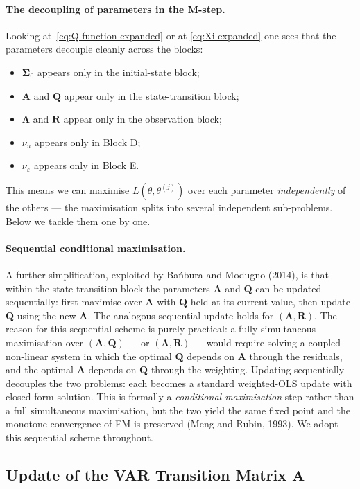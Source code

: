 \documentclass[11pt, a4paper, oneside]{article}
\newcommand{\mL}{\boldsymbol{\Lambda}}
\newcommand{\mA}{\mathbf{A}}
\newcommand{\mR}{\mathbf{R}}
\newcommand{\mQ}{\mathbf{Q}}
\begin{document}
\paragraph{The decoupling of parameters in the M-step.}
Looking at~\eqref{eq:Q-function-expanded} or at \eqref{eq:Xi-expanded} one sees that the parameters
decouple cleanly across the blocks:
\begin{itemize}[leftmargin=1.5em, itemsep=2pt]
    \item $\boldsymbol{\Sigma}_0$ appears only in the initial-state block;
    \item $\mA$ and $\mQ$ appear only in the state-transition block;
    \item $\mL$ and $\mR$ appear only in the observation block;
    \item $\nu_u$ appears only in Block D;
    \item $\nu_\varepsilon$ appears only in Block E.
\end{itemize}
This means we can maximise $L(\theta, \theta^{(j)})$ over each
parameter \emph{independently} of the others — the maximisation splits
into several independent sub-problems. Below we tackle them one by one.

\paragraph{Sequential conditional maximisation.}
A further simplification, exploited by Bańbura and Modugno (2014), is
that within the state-transition block the parameters $\mA$ and $\mQ$
can be updated sequentially: first maximise over $\mA$ with $\mQ$ held
at its current value, then update $\mQ$ using the new $\mA$. The
analogous sequential update holds for $(\mL, \mR)$. The reason for
this sequential scheme is purely practical: a fully simultaneous
maximisation over $(\mA, \mQ)$ — or $(\mL, \mR)$ — would require
solving a coupled non-linear system in which the optimal $\mQ$ depends
on $\mA$ through the residuals, and the optimal $\mA$ depends on $\mQ$
through the weighting. Updating sequentially decouples the two
problems: each becomes a standard weighted-OLS update with closed-form
solution. This is formally a \emph{conditional-maximisation} step
rather than a full simultaneous maximisation, but the two yield the
same fixed point and the monotone convergence of EM is preserved
(Meng and Rubin, 1993). We adopt this sequential scheme throughout.

\subsection{Update of the VAR Transition Matrix $\mathbf{A}$}
\label{subsec:update-A}
\end{document}

